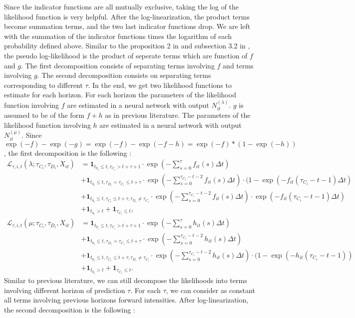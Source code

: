 Since the indicator functions are all mutually exclusive, taking the log of the likelihood function is very helpful. After the log-linearization, the product terms become summation terms, and the two last indicator functions drop. We are left with the summation of the indicator functions times the logarithm of each probability defined above. Similar to the proposition 2 in \citet{DSW} and subsection 3.2 in \citet{Duan2012}, the pseudo log-likelihood is the product of seperate terms which are function of $f$ and $g$. The first decomposition consists of separating terms involving $f$ and terms involving $g$. The second decomposition consists on separating terms corresponding to different $\tau$. In the end, we get two likelihood functions to estimate for each horizon. For each horizon the parameters of the likelihood function involving $f$ are estimated in a neural network with output $N_{it}^{(\lambda)}$. $g$ is assumed to be of the form $f + h$ as in previous literature. The parameters of the likelihood function involving $h$ are estimated in a neural network with output $N_{it}^{(\mu)}$. Since $\exp(-f)-\exp(-g) = \exp(-f)-\exp(-f-h) = \exp(-f)*(1-\exp(-h))$, the first decomposition is the following :
\begin{align}
    \mathcal{L}_{\tau,i,t}(\lambda; \tau_{C_i},\tau_{D_i}, X_{it}) &= \textbf{1}_{t_{0_i} \leq t, \tau_{C_i} > t+\tau+1} \cdot \exp(-\sum_{s=0}^{\tau} f_{it}(s)\Delta t) \\ \nonumber
    &+ \textbf{1}_{t_{0_i} \leq t, \tau_{D_i}=\tau_{C_i} \leq t+\tau} \cdot \exp(-\sum_{s=0}^{\tau_{C_i}-t-2} f_{it}(s)\Delta t) \cdot (1 - \exp(-f_{it}(\tau_{C_i}-t-1)\Delta t) \\ \nonumber
    &+ \textbf{1}_{t_{0_i} \leq t, \tau_{C_i} \leq t+\tau, \tau_{D_i} \neq \tau_{C_i}} \cdot \exp(-\sum_{s=0}^{\tau_{C_i}-t-2} f_{it}(s) \Delta t) \cdot \exp(-f_{it}(\tau_{C_i}-t-1)\Delta t) \\ \nonumber
    &+ \textbf{1}_{t_{0_i}>t} + \textbf{1}_{\tau_{C_i} \leq t},
\end{align}
\begin{align}
    \mathcal{L}_{\tau,i,t}(\mu; \tau_{C_i},\tau_{D_i}, X_{it}) &= \textbf{1}_{t_{0_i} \leq t, \tau_{C_i} > t+\tau+1} \cdot \exp(-\sum_{s=0}^{\tau} h_{it}(s)\Delta t) \\ \nonumber
    &+ \textbf{1}_{t_{0_i} \leq t, \tau_{D_i}=\tau_{C_i} \leq t+\tau} \cdot \exp(-\sum_{s=0}^{\tau_{C_i}-t-2} h_{it}(s)\Delta t)  \\ \nonumber
    &+ \textbf{1}_{t_{0_i} \leq t, \tau_{C_i} \leq t+\tau, \tau_{D_i} \neq \tau_{C_i}} \cdot \exp(-\sum_{s=0}^{\tau_{C_i}-t-2} h_{it}(s) \Delta t) \cdot (1-\exp(-h_{it}(\tau_{C_i}-t-1)) \\  \nonumber
    &+ \textbf{1}_{t_{0_i}>t} + \textbf{1}_{\tau_{C_i} \leq t}.
\end{align}
Similar to previous literature, we can still decompose the likelihoods into terms involving different horizon of prediction $\tau$. For each $\tau$, we can consider as constant all terms involving previous horizons forward intensities. After log-linearization, the second decomposition is the following :

